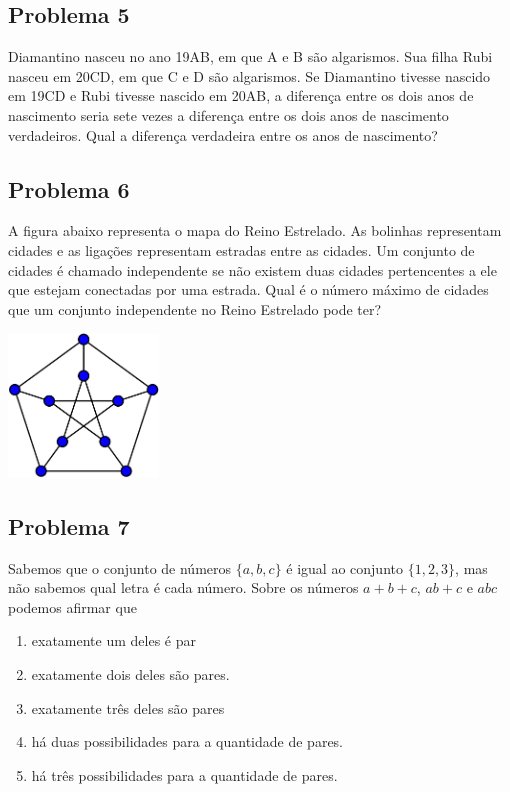 \documentclass[12pt]{article}
\begin{document}
\clearpage

\subsection{Problema 5}
\begin{tcolorbox}[statementbox]
Diamantino nasceu no ano 19AB, em que A e B são algarismos. Sua filha Rubi nasceu em 20CD, em que C e D são algarismos. Se
Diamantino tivesse nascido em 19CD e Rubi tivesse nascido em 20AB, a diferença entre os dois anos de nascimento seria sete vezes a
diferença entre os dois anos de nascimento verdadeiros. Qual a diferença verdadeira entre os anos de nascimento?
\end{tcolorbox}

\clearpage

\subsection{Problema 6}
\begin{tcolorbox}[statementbox]
A figura abaixo representa o mapa do Reino Estrelado. As bolinhas representam cidades e as ligações representam estradas entre 
as cidades. Um conjunto de cidades é chamado independente se não existem duas cidades pertencentes a ele que estejam conectadas por 
uma estrada. Qual é o número máximo de cidades que um conjunto independente no Reino Estrelado pode ter?
\begin{center}
  \includegraphics[width=0.3\textwidth]{second.png}
\end{center}
\end{tcolorbox}

\clearpage

\subsection{Problema 7}
\begin{tcolorbox}[statementbox]
Sabemos que o conjunto de números \(\{a, b, c\}\) é igual ao conjunto \(\{1, 2, 3\}\), mas não sabemos qual letra é cada número.
Sobre os números \(a+b+c\), \(ab+c\) e \(abc\) podemos afirmar que
          \begin{enumerate}[label=({\Alph*})]
            \item exatamente um deles é par
            \item exatamente dois deles são pares.
            \item exatamente três deles são pares
            \item há duas possibilidades para a quantidade de pares.
            \item há três possibilidades para a quantidade de pares.
          \end{enumerate}

\end{tcolorbox}
\end{document}
